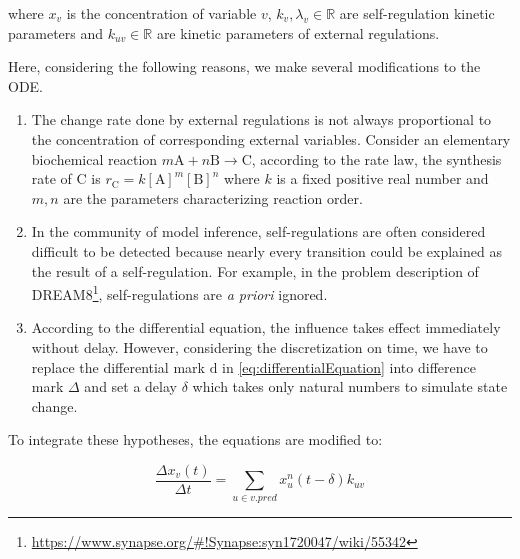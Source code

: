where $x_v$ is the concentration of variable $v$, $k_v, \lambda_v\in \mathbb{R}$ are self-regulation kinetic parameters and $k_{uv}\in \mathbb{R}$ are kinetic parameters of external regulations.


Here, considering the following reasons, we make several modifications to the ODE.
\begin{enumerate}
    \item The change rate done by external regulations is not always proportional to the concentration of corresponding external variables. 
    Consider an elementary biochemical reaction $m\mathrm{A}+n\mathrm{B}\rightarrow \mathrm  {C}$, according to the rate law, the synthesis rate of C is $r_{\mathrm{C}}=k[{\mathrm{A}}]^{m}[{\mathrm{B}}]^{n}$ where $k$ is a fixed positive real number and $m,n$ are the parameters characterizing reaction order.
    \item In the community of model inference, self-regulations are often considered difficult to be detected because nearly every transition could be explained as the result of a self-regulation.
    For example, in the problem description of DREAM8\footnote{\url{https://www.synapse.org/\#!Synapse:syn1720047/wiki/55342}}, self-regulations are \textit{a priori} ignored.  
    \item According to the differential equation, the influence takes effect immediately without delay.
    However, considering the discretization on time, we have to replace the differential mark $\mathrm{d}$ in \ref{eq:differentialEquation} into difference mark $\Delta$ and set a delay $\delta$ which takes only natural numbers to simulate state change.
\end{enumerate}

To integrate these hypotheses, the equations are modified to:

\begin{equation}\label{eq:differenceEquation}
    \frac{\Delta{x_v(t)}}{\Delta t}=\sum_{u\in v.pred}{x_u^{n}(t-\delta)k_{uv}}
\end{equation}


